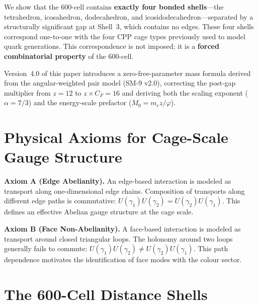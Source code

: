 \documentclass[11pt,letterpaper]{article}
\newcommand{\phig}{\varphi}
\begin{document}
We show that the 600-cell contains \textbf{exactly four bonded
shells}---the tetrahedron, icosahedron, dodecahedron, and
icosidodecahedron---separated by a structurally significant gap at
Shell~3, which contains no edges.  These four shells correspond
one-to-one with the four CPP cage types previously used to model
quark generations.  This correspondence is not imposed; it is a
\textbf{forced combinatorial property} of the 600-cell.

Version~4.0 of this paper introduces a zero-free-parameter mass
formula derived from the angular-weighted pair model (SM-9 v2.0),
correcting the post-gap multiplier from $z = 12$ to
$z \times C_F = 16$ and deriving both the scaling exponent
($\alpha = 7/3$) and the energy-scale prefactor
($M_0 = m_e z/\phig$).

\section{Physical Axioms for Cage-Scale Gauge Structure}
\label{sec:axioms}

\textbf{Axiom A (Edge Abelianity).}
An edge-based interaction is modeled as transport along
one-dimensional edge chains.  Composition of transports along
different edge paths is commutative:
$U(\gamma_1)U(\gamma_2)=U(\gamma_2)U(\gamma_1)$.
This defines an effective Abelian gauge structure at the cage scale.

\textbf{Axiom B (Face Non-Abelianity).}
A face-based interaction is modeled as transport around closed
triangular loops.  The holonomy around two loops generally fails to
commute:
$U(\gamma_1)U(\gamma_2)\neq U(\gamma_2)U(\gamma_1)$.
This path dependence motivates the identification of face modes with
the colour sector.

\section{The 600-Cell Distance Shells}
\label{sec:shells}
\end{document}
